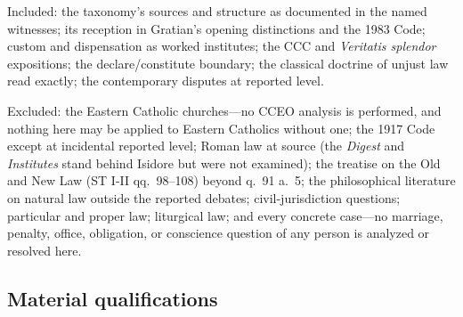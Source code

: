 Included: the taxonomy's sources and structure as documented in the named witnesses; its reception in Gratian's opening distinctions and the 1983 Code; custom and dispensation as worked institutes; the CCC and \emph{Veritatis splendor} expositions; the declare/constitute boundary; the classical doctrine of unjust law read exactly; the contemporary disputes at reported level.

Excluded: the Eastern Catholic churches---no CCEO analysis is performed, and nothing here may be applied to Eastern Catholics without one; the 1917 Code except at incidental reported level; Roman law at source (the \emph{Digest} and \emph{Institutes} stand behind Isidore but were not examined); the treatise on the Old and New Law (ST I-II qq.~98--108) beyond q.~91 a.~5; the philosophical literature on natural law outside the reported debates; civil-jurisdiction questions; particular and proper law; liturgical law; and every concrete case---no marriage, penalty, office, obligation, or conscience question of any person is analyzed or resolved here.

\subsection{Material qualifications}

